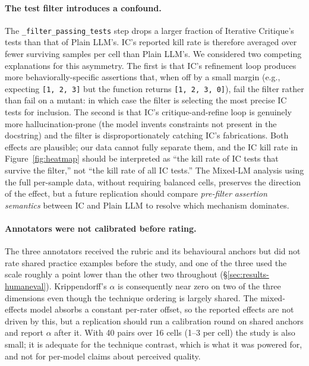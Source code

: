 \documentclass[smallextended]{svjour3}
\begin{document}
\paragraph{The test filter introduces a confound.}
The \verb|_filter_passing_tests| step drops a larger fraction of
Iterative Critique's tests than that of Plain LLM's. IC's reported
kill rate is therefore averaged over fewer surviving samples per
cell than Plain LLM's. We considered two competing explanations
for this asymmetry. The first is that IC's refinement loop produces
more behaviorally-specific assertions that, when off by a small
margin (e.g., expecting \texttt{[1, 2, 3]} but the function returns
\texttt{[1, 2, 3, 0]}), fail the filter rather than fail on a
mutant: in which case the filter is selecting the most precise IC
tests for inclusion. The second is that IC's critique-and-refine
loop is genuinely more hallucination-prone (the model invents
constraints not present in the docstring) and the filter is
disproportionately catching IC's fabrications. Both effects are
plausible; our data cannot fully separate them, and the IC kill
rate in Figure~\ref{fig:heatmap} should be interpreted as
``the kill rate of IC tests that survive the filter,'' not ``the
kill rate of all IC tests.'' The Mixed-LM analysis using the full
per-sample data, without requiring balanced cells, preserves the
direction of the effect, but a future replication should compare
\emph{pre-filter assertion semantics} between IC and Plain LLM to
resolve which mechanism dominates.

\paragraph{Annotators were not calibrated before rating.}
The three annotators received the rubric and its behavioural anchors
but did not rate shared practice examples before the study, and one
of the three used the scale roughly a point lower than the other two
throughout (\S\ref{sec:results-humaneval}). Krippendorff's $\alpha$
is consequently near zero on two of the three dimensions even though
the technique ordering is largely shared. The mixed-effects model
absorbs a constant per-rater offset, so the reported effects are not
driven by this, but a replication should run a calibration round on
shared anchors and report $\alpha$ after it. With 40 pairs over 16
cells (1--3 per cell) the study is also small; it is adequate for the
technique contrast, which is what it was powered for, and not for
per-model claims about perceived quality.
\end{document}
